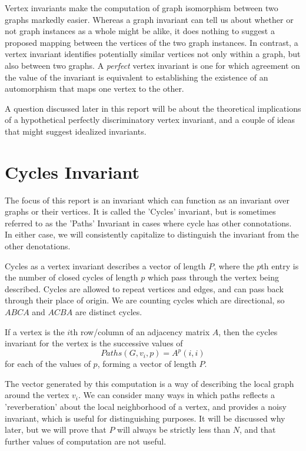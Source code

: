\documentclass[11pt,a4paper]{report}
\begin{document}
Vertex invariants make the computation of graph isomorphism between two graphs markedly easier. 
Whereas a graph invariant can tell us about whether or not graph instances as a whole might be alike, it does nothing to suggest a proposed mapping between the vertices of the two graph instances.
In contrast, a vertex invariant identifies potentially similar vertices not only within a graph, but also between two graphs.
A \emph{perfect} vertex invariant is one for which agreement on the value of the invariant is equivalent to establishing the existence of an automorphism that maps one vertex to the other.

A question discussed later in this report will be about the theoretical implications of a hypothetical perfectly discriminatory vertex invariant, and a couple of ideas that might suggest idealized invariants.

\section{Cycles Invariant}
The focus of this report is an invariant which can function as an invariant over graphs or their vertices.
It is called the 'Cycles' invariant, but is sometimes referred to as the 'Paths' Invariant in cases where cycle has other connotations.
In either case, we will consistently capitalize to distinguish the invariant from the other denotations.

Cycles as a vertex invariant describes a vector of length $P$, where the $p$th entry is the number of closed cycles of length $p$ which pass through the vertex being described.
Cycles are allowed to repeat vertices and edges, and can pass back through their place of origin.
We are counting cycles which are directional, so $ABCA$ and $ACBA$ are distinct cycles. 

If a vertex is the $i$th row/column of an adjacency matrix $A$, then the cycles invariant for the vertex is the successive values of $$Paths(G, v_i, p) = A^p(i,i)$$
for each of the values of $p$, forming a vector of length $P$.

The vector generated by this computation is a way of describing the local graph around the vertex $v_i$.
We can consider many ways in which paths reflects a 'reverberation' about the local neighborhood of a vertex, and provides a noisy invariant, which is useful for distinguishing purposes. 
It will be discussed why later, but we will prove that $P$ will always be strictly less than $N$, and that further values of computation are not useful.
\end{document}

